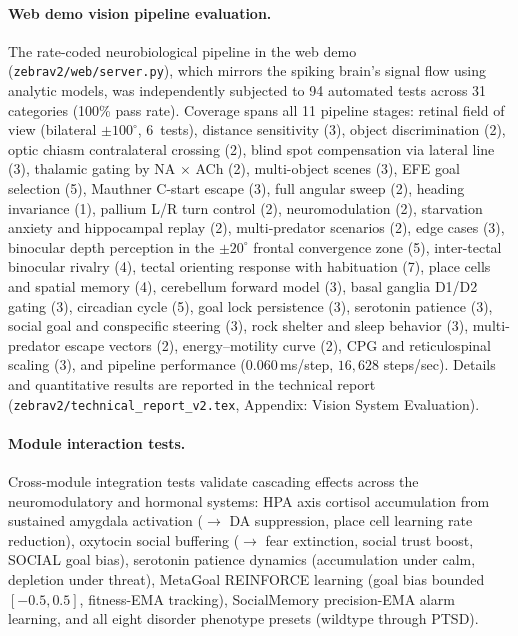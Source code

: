 \documentclass[12pt]{article}
\begin{document}
\paragraph{Web demo vision pipeline evaluation.}
The rate-coded neurobiological pipeline in the web demo
(\texttt{zebrav2/web/server.py}), which mirrors the spiking brain's
signal flow using analytic models, was independently subjected to
94 automated tests across 31 categories (100\% pass rate).
Coverage spans all 11 pipeline stages: retinal field of view (bilateral
$\pm100^\circ$, 6~tests), distance sensitivity (3), object discrimination (2),
optic chiasm contralateral crossing (2), blind spot compensation via
lateral line (3), thalamic gating by NA$\,\times\,$ACh (2),
multi-object scenes (3), EFE goal selection (5), Mauthner C-start
escape (3), full angular sweep (2), heading invariance (1), pallium
L/R turn control (2), neuromodulation (2), starvation anxiety and
hippocampal replay (2), multi-predator scenarios (2), edge cases (3),
binocular depth perception in the $\pm20^\circ$ frontal convergence
zone (5), inter-tectal binocular rivalry (4), tectal orienting
response with habituation (7), place cells and spatial memory (4),
cerebellum forward model (3), basal ganglia D1/D2 gating (3),
circadian cycle (5), goal lock persistence (3), serotonin patience (3),
social goal and conspecific steering (3), rock shelter and sleep
behavior (3), multi-predator escape vectors (2), energy--motility
curve (2), CPG and reticulospinal scaling (3), and pipeline
performance ($0.060$\,ms/step, $16{,}628$ steps/sec).
Details and quantitative results are reported in the technical report
(\texttt{zebrav2/technical\_report\_v2.tex}, Appendix: Vision System Evaluation).

\paragraph{Module interaction tests.}
\begin{sloppypar}
Cross-module integration tests validate cascading effects across the
neuromodulatory and hormonal systems: HPA axis cortisol accumulation
from sustained amygdala activation ($\to$ DA suppression, place cell
learning rate reduction), oxytocin social buffering ($\to$ fear extinction,
social trust boost, SOCIAL goal bias), serotonin patience dynamics
(accumulation under calm, depletion under threat), MetaGoal REINFORCE
learning (goal bias bounded $[-0.5, 0.5]$, fitness-EMA tracking),
SocialMemory precision-EMA alarm learning, and all eight disorder
phenotype presets (wildtype through PTSD).
\end{sloppypar}
\end{document}
